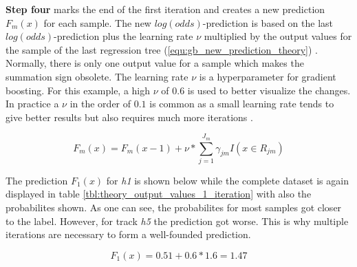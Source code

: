 \textbf{Step four} marks the end of the first iteration and creates a new prediction \(F_{m}(x)\) for each sample. 
The new \(log(odds)\)-prediction is based on the last \(log(odds)\)-prediction plus the learning rate \(\nu\) multiplied by 
the output values for the sample of the last regression tree (\ref{equ:gb_new_prediction_theory}) \cite[p. 1203]{Friedman_2001}. Normally, there is only one 
output value for a sample which makes the summation sign obsolete. The learning rate \(\nu\) is a 
hyperparameter for gradient boosting. For this example, a high \(\nu\) of \(0.6\) is used to better visualize 
the changes. In practice a \(\nu \) in the order of \(0.1\) is common as a small learning rate tends to
give better results but also requires much more iterations \cite[p. 1206]{Friedman_2001}. 

\begin{equation}
    F_{m}(x) = F_{m}(x- 1) + \nu * \sum_{j = 1}^{J_{m}} \gamma_{jm}I(x \in R_{jm})
    \label{equ:gb_new_prediction_theory}
\end{equation}

The prediction \(F_{1}(x)\) for \emph{h1} is shown below while the complete dataset is again displayed in table \ref{tbl:theory_output_values_1_iteration} with also 
the probabilites shown. As one can see, the probabilites for most samples got closer to the label. However, for track
\emph{h5} the prediction got worse. This is why multiple iterations are necessary to form a well-founded prediction.

\begin{equation*}
F_{1}(x) = 0.51 + 0.6 * 1.6 = 1.47
\end{equation*}


